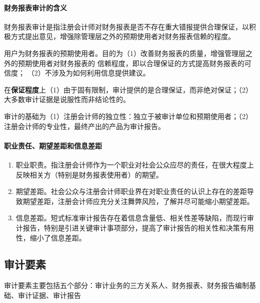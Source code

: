 \documentclass[UTF8,12pt]{ctexart}
\numberwithin{equation}{section} %
\numberwithin{figure}{section}
\numberwithin{table}{section}
\begin{document}
	\paragraph{财务报表审计的含义}财务报表审计是指注册会计师对财务报表是否不存在重大错报提供合理保证，以积极方式提出意见，增强除管理层之外的预期使用者对财务报表信赖的程度。
	
	用户为财务报表的预期使用者。目的为（1）改善财务报表的质量，增强管理层之外的预期使用者对财务报表的
	信赖程度，即以合理保证的方式提高财务报表的可信度；
	（2）不涉及为如何利用信息提供建议。
	
	在\textbf{保证程度}上（1）由于固有限制，审计提供的是合理保证，而非绝对保证；（2）大多数审计证据是说服性而非结论性的。
	
	审计的基础为（1）注册会计师的独立性：独立于被审计单位和预期使用者；（2）注册会计师的专业性，最终产出的产品为审计报告。
	
	\paragraph{职业责任、期望差距和信息差距}
	\begin{enumerate}
		\item 职业职责。指注册会计师作为一个职业对社会公众应尽的责任，在很大程度上反映相关方（特别是财务报表使用者）的期望。
		
		\item 期望差距。社会公众与注册会计师职业界在对职业责任的认识上存在的差距导致期望差距，注册会计师应充分关注舞弊风险，了解并尽可能缩小期望差距。
		
		\item 信息差距。短式标准审计报告存在着信息含量低、相关性差等缺陷，而现行审计报告，特别是引进关键审计事项部分，提高了审计报告的相关性和决策有用性，缩小了信息差距。
	\end{enumerate}
	
	
	\subsection{审计要素}
	审计要素主要包括五个部分：审计业务的三方关系人、财务报表、财务报告编制基础、审计证据、审计报告
	
\end{document}
